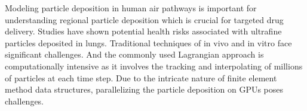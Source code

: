 \large
Modeling particle deposition in human air pathways is important for understanding regional particle deposition which is crucial for targeted drug delivery. Studies have shown potential health risks associated with ultrafine particles deposited in lungs. Traditional techniques of in vivo and in vitro face significant challenges. And the commonly used Lagrangian approach is computationally intensive as it involves the tracking and interpolating of millions of particles at each time step. Due to the intricate nature of finite element method data structures, parallelizing the particle deposition on GPUs poses challenges.
